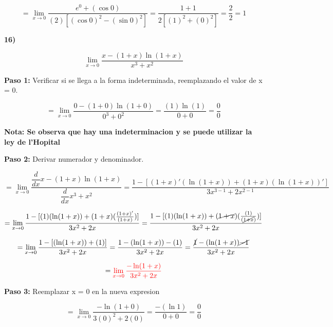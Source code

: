 \documentclass[12pt,a4paper]{article}
\begin{document}
\[
= \lim_{x \to 0} \frac{e^0 + (\cos 0)}{(2)[(\cos 0)^2- (\sin 0)^2]}= \frac{1+1}{2[(1)^2+(0)^2]}= \frac{2}{2}= 1
\]


\vspace{0.2cm}
\newpage


\textbf{16)}

\[
\lim_{x \to 0} \frac{x- (1+x)\ln(1+x)}{x^3 + x^2} 
\]


\vspace{0.2cm}

\textbf{Paso 1:}
\vspace{0.2cm}
Verificar si se llega a la forma indeterminada, reemplazando el valor de x = 0.

\[
= \lim_{x \to 0} \frac{0- (1+0)\ln(1+0)}{0^3 + 0^2}= \frac{(1)\ln(1)}{0 + 0} = \frac{0}{0}
\]

\vspace{0.2cm}

\textbf{Nota: Se observa que hay una indeterminacion y se puede utilizar la ley de l'Hopital }

\vspace{0.5cm}

\textbf{Paso 2:}
\vspace{0.2cm}
Derivar numerador y denominador.

\[
= \lim_{x \to 0} \frac{\dfrac{d}{dx} x- (1+x)\ln(1+x)}{\dfrac{d}{dx} {x^3 + x^2}} =  \frac{ 1 - [(1+x)'(\ln(1+x))+(1+x)(\ln(1+x))']}{3x^{3-1} + 2x^{2-1}}
\]


\[
= \lim_{x \to 0} \frac{1 - [(1)(\ln(1+x))+(1+x)(\frac{(1+x)'}{(1+x)})]}{3x^{2} + 2x}= \frac{1 - [(1)(\ln(1+x))+(\cancel{1+x})(\frac{(1)}{(\cancel{1+x})})]}{3x^{2} + 2x}
\]

\[
= \lim_{x \to 0} \frac{1 - [(\ln(1+x))+ (1)]}{3x^{2} + 2x}= \frac{1 -(\ln(1+x))- (1)}{3x^{2} + 2x}= \frac{\cancel{1} - (\ln(1+x)) \cancel{-1}}{3x^{2} + 2x}
\]

\[
= \textcolor{red}{\lim_{x \to 0} \frac{- \ln(1+x)}{3x^{2} + 2x}}
\]

\vspace{0.2cm}



\textbf{Paso 3:}
\vspace{0.2cm}
Reemplazar x = 0 en la nueva expresion

\[
={\lim_{x \to 0} \frac{- \ln(1+0)}{3(0)^{2} + 2(0)}} = \frac{- (\ln 1)}{0+0}= \frac{0}{0}
\]
\end{document}

